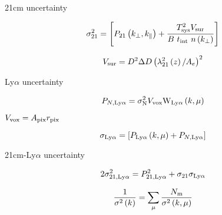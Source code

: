 21cm uncertainty

\begin{equation}
\sigma_{21}^2 = \left[ P_{21}\left(k_{\perp}, k_{\parallel} \right) + \frac{T^2_{\rm sys} V_{\rm sur}}{B \ t_{\rm int} \ n \left(k_{\perp}\right)} \right]
\end{equation}

\begin{equation}
V_{\rm sur} = D^2 \Delta D \left( \lambda_{21}^2 \left( z \right) / A_e\right)^2
\end{equation}


Ly$\alpha$ uncertainty

\begin{equation}
P_{N, \rm Ly\alpha} = \sigma_{\rm N}^2 V_{\text{vox}} {\rm W}_{\rm Ly\alpha}\left(k, \mu \right)
\end{equation}

$V_{\rm vox} = A_{\rm pix} r_{\rm pix}$

\begin{equation}
\sigma_{\rm Ly\alpha} = \left[ P_{\rm Ly\alpha}\left(k, \mu \right) + P_{N, \rm Ly\alpha} \right]
\end{equation}

21cm-Ly$\alpha$ uncertainty


\begin{equation}
    2 \sigma^2_{21, \rm Ly\alpha} = P^2_{21, \rm Ly\alpha} + \sigma_{21} \sigma_{\rm Ly\alpha}
\end{equation}

\begin{equation}
\frac{1}{\sigma^2 \left( k \right)} = \sum_{\mu} \frac{N_{\rm m}}{\sigma^2 \left( k, \mu \right)}
\end{equation}
